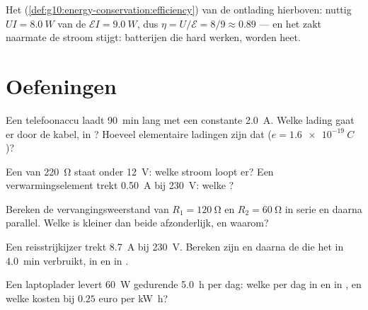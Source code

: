 \begin{example}\label{ex:g11:circuits-and-power:efficiency}
Het  (\cref{def:g10:energy-conservation:efficiency}) van de
ontlading hierboven: nuttig $UI = \qty{8.0}{W}$ van de
$\mathcal{E}I = \qty{9.0}{W}$, dus $\eta = U/\mathcal{E} = 8/9 \approx
0.89$ --- en het zakt naarmate de stroom stijgt: batterijen die hard
werken, worden heet.
\end{example}

\section{Oefeningen}

\begin{exercise}[$\star$]\label{exo:g11:circuits-and-power:1}
Een telefoonaccu laadt \qty{90}{min} lang met een constante
\qty{2.0}{A}. Welke lading gaat er door de kabel, in ? Hoeveel
elementaire ladingen zijn dat ($e = \qty{1.6e-19}{C}$)?
\end{exercise}

\begin{exercise}[$\star$]\label{exo:g11:circuits-and-power:2}
Een  van \qty{220}{\ohm} staat onder \qty{12}{V}: welke stroom
loopt er? Een verwarmingselement trekt \qty{0.50}{A} bij \qty{230}{V}:
welke ?
\end{exercise}

\begin{exercise}[$\star$]\label{exo:g11:circuits-and-power:3}
Bereken de vervangingsweerstand van $R_1 = \qty{120}{\ohm}$ en
$R_2 = \qty{60}{\ohm}$ in serie en daarna parallel. Welke is kleiner dan
beide afzonderlijk, en waarom?
\end{exercise}

\begin{exercise}[$\star$]\label{exo:g11:circuits-and-power:4}
Een reisstrijkijzer trekt \qty{8.7}{A} bij \qty{230}{V}. Bereken zijn
 en daarna de  die het in \qty{4.0}{min} verbruikt, in
 en in .
\end{exercise}

\begin{exercise}[$\star$]\label{exo:g11:circuits-and-power:5}
Een laptoplader levert \qty{60}{W} gedurende \qty{5.0}{h} per dag: welke
 per dag in  en in , en welke kosten bij $0.25$
euro per \unit{kW.h}?
\end{exercise}

